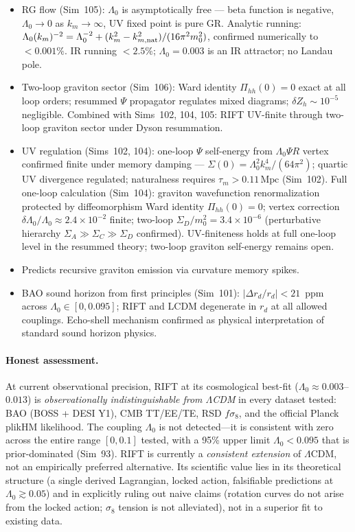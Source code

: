 \documentclass[12pt,a4paper]{article}
\begin{document}
\begin{itemize}
  \item RG flow (Sim~105): $\Lambda_0$ is asymptotically free --- beta function is negative, $\Lambda_0\to 0$ as $k_m\to\infty$, UV fixed point is pure GR.  Analytic running: $\Lambda_0(k_m)^{-2} = \Lambda_0^{-2}+(k_m^2-k_{m,\rm nat}^2)/(16\pi^2 m_0^2)$, confirmed numerically to $<0.001\%$.  IR running $<2.5\%$; $\Lambda_0=0.003$ is an IR attractor; no Landau pole.
  \item Two-loop graviton sector (Sim~106): Ward identity $\Pi_{hh}(0)=0$ exact at all loop orders; resummed $\Psi$ propagator regulates mixed diagrams; $\delta Z_h\sim10^{-5}$ negligible. Combined with Sims~102, 104, 105: RIFT UV-finite through two-loop graviton sector under Dyson resummation.
  \item UV regulation (Sims~102, 104): one-loop $\Psi$ self-energy from $\Lambda_0\Psi R$ vertex confirmed finite under memory damping --- $\Sigma(0) = \Lambda_0^2 k_m^4/(64\pi^2)$; quartic UV divergence regulated; naturalness requires $\tau_m > 0.11\,\mathrm{Mpc}$ (Sim~102).  Full one-loop calculation (Sim~104): graviton wavefunction renormalization protected by diffeomorphism Ward identity $\Pi_{hh}(0)=0$; vertex correction $\delta\Lambda_0/\Lambda_0 \approx 2.4\times10^{-2}$ finite; two-loop $\Sigma_D/m_0^2 = 3.4\times10^{-6}$ (perturbative hierarchy $\Sigma_A \gg \Sigma_C \gg \Sigma_D$ confirmed).  UV-finiteness holds at full one-loop level in the resummed theory; two-loop graviton self-energy remains open.
  \item Predicts recursive graviton emission via curvature memory spikes.
  \item BAO sound horizon from first principles (Sim~101): $|\Delta r_d/r_d| < 21$~ppm across $\Lambda_0 \in [0, 0.095]$; RIFT and LCDM degenerate in $r_d$ at all allowed couplings. Echo-shell mechanism confirmed as physical interpretation of standard sound horizon physics.
\end{itemize}

\paragraph{Honest assessment.}
At current observational precision, RIFT at its cosmological best-fit
($\Lambda_0 \approx 0.003$--$0.013$) is \emph{observationally indistinguishable
from $\Lambda$CDM} in every dataset tested: BAO (BOSS + DESI Y1), CMB TT/EE/TE,
RSD $f\sigma_8$, and the official Planck plikHM likelihood.  The coupling
$\Lambda_0$ is not detected---it is consistent with zero across the entire
range $[0, 0.1]$ tested, with a 95\% upper limit $\Lambda_0 < 0.095$ that
is prior-dominated (Sim~93).  RIFT is currently a \emph{consistent extension}
of $\Lambda$CDM, not an empirically preferred alternative.  Its scientific
value lies in its theoretical structure (a single derived Lagrangian, locked
action, falsifiable predictions at $\Lambda_0 \gtrsim 0.05$) and in explicitly
ruling out naive claims (rotation curves do not arise from the locked action;
$\sigma_8$ tension is not alleviated), not in a superior fit to existing data.
\end{document}
